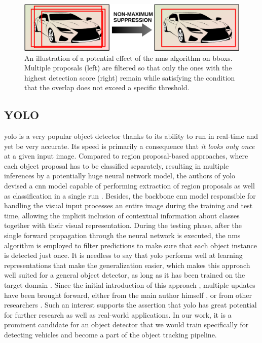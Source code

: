 \begin{figure}[t]
    \centerline{\includegraphics[width=0.7\linewidth]{figures/theoretical_foundations/non_maximum_suppression.pdf}}
    \caption[\Gls{nms} visualization]{An illustration of a potential effect of the \gls{nms} algorithm on \glspl{bbox}. Multiple proposals (left) are filtered so that only the ones with the highest detection score (right) remain while satisfying the condition that the overlap does not exceed a specific threshold.}
    \label{fig:NonMaximumSuppression}
\end{figure}

\subsection{YOLO}
\label{ssec:YouLookOnlyOnce}

\Gls{yolo} is a very popular object detector thanks to its ability to run in real-time and yet be very accurate. Its speed is primarily a consequence that \emph{it looks only once} at a given input image. Compared to region proposal-based approaches, where each object proposal has to be classified separately, resulting in multiple inferences by a potentially huge neural network model, the authors of \gls{yolo} devised a \gls{cnn} model capable of performing extraction of region proposals as well as classification in a single run \cite{Redmon2016}. Besides, the backbone \gls{cnn} model responsible for handling the visual input processes an entire image during the training and test time, allowing the implicit inclusion of contextual information about classes together with their visual representation. During the testing phase, after the single forward propagation through the neural network is executed, the \gls{nms} algorithm is employed to filter predictions to make sure that each object instance is detected just once. It is needless to say that \Gls{yolo} performs well at learning representations that make the generalization easier, which makes this approach well suited for a general object detector, as long as it has been trained on the target domain \cite{Redmon2016}. Since the initial introduction of this approach \cite{Redmon2016}, multiple updates have been brought forward, either from the main author himself \cite{Redmon2017, Redmon2018}, or from other researchers \cite{Wang, Wong2019}. Such an interest supports the assertion that \gls{yolo} has great potential for further research as well as real-world applications. In our work, it is a prominent candidate for an object detector that we would train specifically for detecting vehicles and become a part of the object tracking pipeline.

